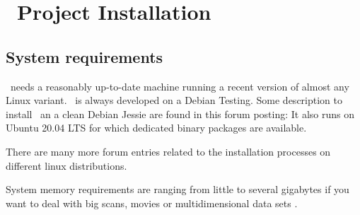 
\chapter{\Gxsm\ Project Installation}
\label{cha:Gxsm-install}

\section{System requirements}
\Gxsm\ needs a reasonably up-to-date machine running a recent version of almost
any Linux variant. \Gxsm\ is always developed on a Debian Testing. Some
description to install \Gxsm\ an a clean Debian Jessie are found in this forum
posting: 
It also runs on Ubuntu 20.04 LTS for which dedicated binary packages are available. 

There are many more forum entries related to the installation processes on 
different linux distributions.

System memory requirements are ranging from little to several gigabytes if you
want to deal with big scans, movies or multidimensional data sets \smiley.


